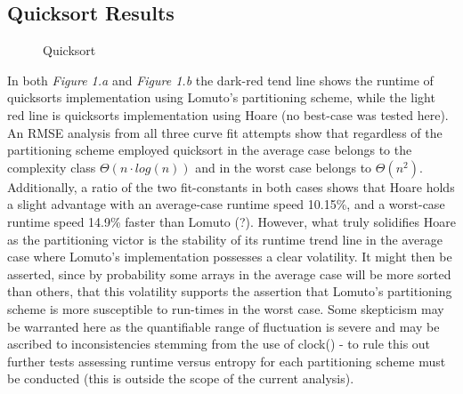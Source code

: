 \documentclass[11pt,letterpaper]{report}
\begin{document}
\subsection*{Quicksort Results}
\begin{figure}[h]
  \centering
  \hfill
  \caption{Quicksort}
\end{figure}

In both \emph{Figure 1.a} and \emph{Figure 1.b} the dark-red tend line shows the runtime of quicksorts implementation using Lomuto's partitioning scheme, while the light red line is quicksorts implementation using Hoare (no best-case was tested here). An RMSE analysis from all three curve fit attempts show that regardless of the partitioning scheme employed quicksort in the average case belongs to the complexity class $\Theta (n \cdot log{}(n))$ and in the worst case belongs to $\Theta(n^2)$. Additionally, a ratio of the two fit-constants in both cases shows that Hoare holds a slight advantage with an average-case runtime speed 10.15\%, and a worst-case runtime speed 14.9\% faster than Lomuto (?). However, what truly solidifies Hoare as the partitioning victor is the stability of its runtime trend line in the average case where Lomuto's implementation possesses a clear volatility. It might then be asserted, since by probability some arrays in the average case will be more sorted than others, that this volatility supports the assertion that Lomuto's partitioning scheme is more susceptible to run-times in the worst case. Some skepticism may be warranted here as the quantifiable range of fluctuation is severe and may be ascribed to inconsistencies stemming from the use of clock() - to rule this out further tests assessing runtime versus entropy for each partitioning scheme must be conducted (this is outside the scope of the current analysis).
\end{document}
